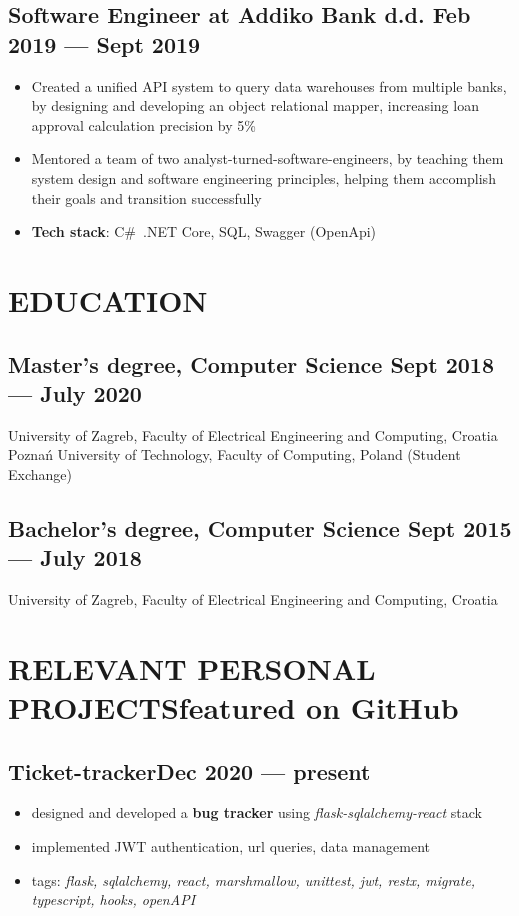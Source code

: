 \documentclass{article}
\begin{document}
\subsection{Software Engineer at Addiko Bank d.d. \hfill Feb 2019 --- Sept 2019}
\begin{itemize}
  \itemsep0em
  \item Created a unified API system to query data warehouses from multiple banks, by designing and developing an object relational mapper, increasing loan approval calculation precision by 5\%
  \item Mentored a team of two analyst-turned-software-engineers, by teaching them system design and software engineering principles, helping them accomplish their goals and transition successfully
  \item {\bfseries Tech stack}: C\#~.NET Core, SQL, Swagger (OpenApi)
\end{itemize}

\section{EDUCATION}
\subsection{Master's degree, Computer Science \hfill Sept 2018 --- July 2020}
University of Zagreb, Faculty of Electrical Engineering and Computing, Croatia\\
Poznań University of Technology, Faculty of Computing, Poland (Student Exchange)

\subsection{Bachelor's degree, Computer Science \hfill Sept 2015 --- July 2018}
University of Zagreb, Faculty of Electrical Engineering and Computing, Croatia


\section{RELEVANT PERSONAL PROJECTS\hfill featured on GitHub}
\subsection{Ticket-tracker\hfill Dec 2020 --- present}
\begin{itemize}
  \itemsep0em
  \item designed and developed a {\bfseries bug tracker} using \textit{flask-sqlalchemy-react} stack
  \item implemented JWT authentication, url queries, data management
  \item tags: \textit{flask, sqlalchemy, react, marshmallow, unittest, jwt, restx, migrate, typescript, hooks, openAPI}
\end{itemize}
\end{document}

